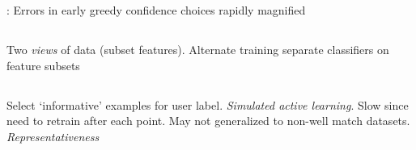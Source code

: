 \documentclass[8pt]{extarticle}
\newcommand{\redbf}[1]{\textbf{\red{#1}}}
\begin{document}
\begin{multicols}{3}
  \redbf{Problem}: Errors in early greedy confidence choices rapidly magnified

  \subsection*{}
  Two \textit{views} of data (subset features). Alternate training separate classifiers on feature subsets

  \subsection*{}
  Select `informative' examples for user label. \textit{Simulated active learning}. Slow since need to retrain after each point. May not generalized to non-well match datasets. \textit{Representativeness}

\end{multicols}
\end{document}
